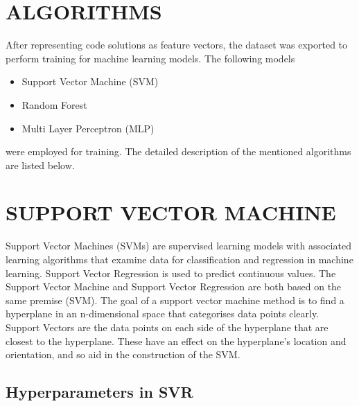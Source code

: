 \section{ALGORITHMS}

After representing code solutions as feature vectors, the dataset was
exported to perform training for machine learning models. The
following models
\begin{itemize}
    \item Support Vector Machine (SVM)
    \item Random Forest 
    \item Multi Layer Perceptron (MLP)
\end{itemize}
were employed for training. The detailed description of the mentioned
algorithms are listed below.

\section{SUPPORT VECTOR MACHINE}

Support Vector Machines (SVMs) are supervised learning models with associated learning algorithms that examine data for classification and regression in machine learning. Support Vector Regression \cite{D} is used to predict continuous values. The Support Vector Machine and Support Vector Regression are both based on the same premise (SVM). The goal of a support vector machine method is to find a hyperplane in an n-dimensional space that categorises data points clearly. Support Vectors are the data points on each side of the hyperplane that are closest to the hyperplane. These have an effect on the hyperplane's location and orientation, and so aid in the construction of the SVM.

\subsection{Hyperparameters in SVR}

